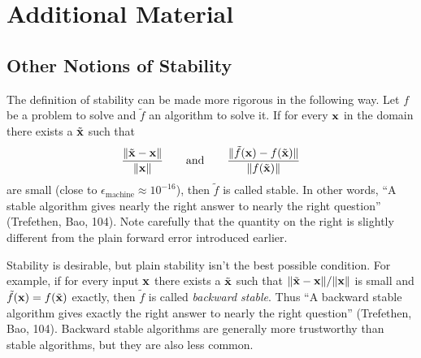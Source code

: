 \newpage

\section*{Additional Material} %

\subsection*{Other Notions of Stability} %

The definition of stability can be made more rigorous in the following way.
Let $f$ be a problem to solve and $\tilde{f}$ an algorithm to solve it.
If for every $\mathbf{x}$ in the domain there exists a $\tilde{\mathbf{x}}$ such that
\[
\frac{\|\tilde{\mathbf{x}} - \mathbf{x}\|}{\|\mathbf{x}\|}
\qquad\text{and}\qquad
\frac{\|\tilde{f}(\mathbf{x}) - f(\tilde{\mathbf{x}})\|}{\|f(\tilde{\mathbf{x}})\|}
\]
are small (close to $\epsilon_{\text{machine}} \approx 10^{-16}$), then $\tilde{f}$ is called stable.
In other words, ``A stable algorithm gives nearly the right answer to nearly the right question'' (Trefethen, Bao, 104).
Note carefully that the quantity on the right is slightly different from the plain forward error introduced earlier.

Stability is desirable, but plain stability isn't the best possible condition.
For example, if for every input $\mathbf{x}$ there exists a $\tilde{\mathbf{x}}$ such that
$\|\tilde{\mathbf{x}} - \mathbf{x}\| / \|\mathbf{x}\|$ is small and $\tilde{f}(\mathbf{x}) = f(\tilde{\mathbf{x}})$ exactly, then $\tilde{f}$ is called \emph{backward stable}.
Thus ``A backward stable algorithm gives exactly the right answer to nearly the right question'' (Trefethen, Bao, 104).
Backward stable algorithms are generally more trustworthy than stable algorithms, but they are also less common.

